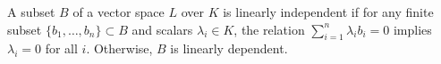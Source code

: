 A subset $B$ of a vector space $L$ over $K$ is linearly independent if for any finite subset $\{b_1, \ldots, b_n\} \subset B$ and scalars $\lambda_i \in K$, the relation $\sum_{i=1}^n \lambda_i b_i = 0$ implies $\lambda_i = 0$ for all $i$. Otherwise, $B$ is linearly dependent.
